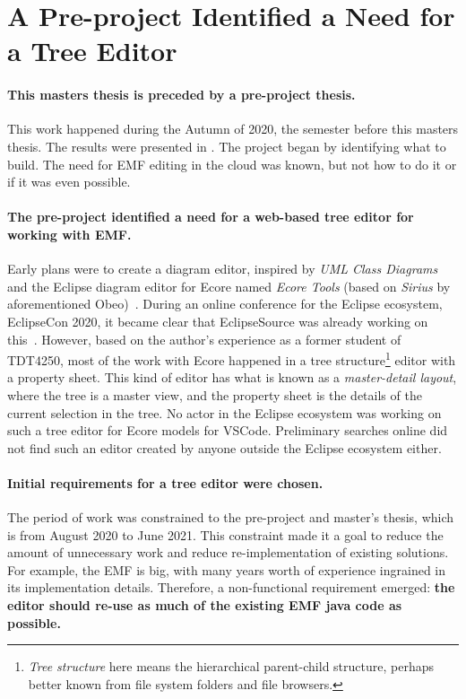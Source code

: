 \section{A Pre-project Identified a Need for a Tree Editor}

\paragraph{This masters thesis is preceded by a pre-project thesis.}
This work happened during the Autumn of 2020, the semester before this masters thesis.
The results were presented in \cite{rekstadModelingEnvironmentCloud2020}.
The project began by identifying what to build.
The need for \acrshort{EMF} editing in the \gls{cloud} was known, but not how to do it or if it was even possible.

\paragraph{The pre-project identified a need for a web-based tree editor for working with \acrshort{EMF}.}
Early plans were to create a diagram editor, inspired by \textit{\gls{UML} Class Diagrams} and the \gls{Eclipse} diagram editor for \gls{Ecore} named \textit{Ecore Tools} (based on \textit{Sirius} by aforementioned Obeo)~\cite{rekstadModelingEnvironmentCloud2020}.
During an online conference for the Eclipse ecosystem, EclipseCon 2020, it became clear that EclipseSource was already working on this~\cite{jonashelmingEcoreToolsCloud2020}.
However, based on the author's experience as a former student of \gls{TDT4250}, most of the work with \gls{Ecore} happened in a tree structure\footnote{\textit{Tree structure} here means the hierarchical parent-child structure, perhaps better known from file system folders and file browsers.} editor with a property sheet.
This kind of editor has what is known as a \textit{master-detail layout}, where the tree is a master view, and the property sheet is the details of the current selection in the tree.
No actor in the Eclipse ecosystem was working on such a tree editor for \gls{Ecore} models for \gls{VSCode}.
Preliminary searches online did not find such an editor created by anyone outside the Eclipse ecosystem either.


\paragraph{Initial requirements for a tree editor were chosen.}
The period of work was constrained to the pre-project and master's thesis, which is from August 2020 to June 2021.
This constraint made it a goal to reduce the amount of unnecessary work and reduce re-implementation of existing solutions.
For example, the \acrlong{EMF} is big, with many years worth of experience ingrained in its implementation details.
Therefore, a non-functional requirement emerged: \textbf{the editor should re-use as much of the existing \acrshort{EMF} java code as possible.}\\

